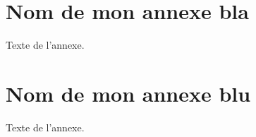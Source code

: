 \chapter{Nom de mon annexe bla}

Texte de l'annexe.

\chapter{Nom de mon annexe blu}

Texte de l'annexe.
